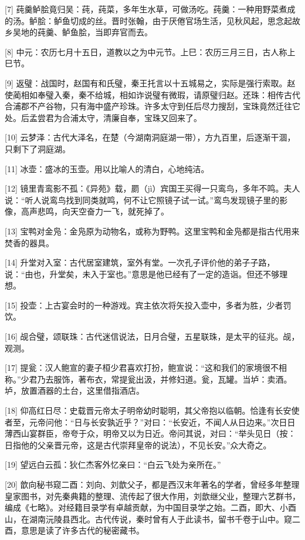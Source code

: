 \documentclass[12pt,UTF8]{ctexbook}
\begin{document}
[7] 莼羹鲈脍竟归吴：莼，莼菜，多年生水草，可做汤吃。莼羹：一种用野菜煮成的汤。鲈脍：鲈鱼切成的丝。晋时张翰，由于厌倦官场生活，见秋风起，思念起故乡吴地的莼羹、鲈鱼脍，当即弃官而去。

[8] 中元：农历七月十五日，道教以之为中元节。上巳：农历三月三日，古人称上巳节。

[9] 返璧：战国时，赵国有和氏璧，秦王托言以十五城易之，实际是强行索取。赵使蔺相如奉璧入秦，秦不给城，相如诈说璧有微瑕，请原璧归赵。还珠：相传古代合浦郡不产谷物，只有海中盛产珍珠。许多太守到任后尽力搜刮，宝珠竟然迁往它处。后孟尝君为合浦太守，清廉自奉，宝珠又回来了。

[10] 云梦泽：古代大泽名，在楚（今湖南洞庭湖一带），方九百里，后逐渐干涸，只剩下了洞庭湖。

[11] 冰壶：盛冰的玉壶。用以比喻人的清白，心地纯洁。

[12] 镜里青鸾影不孤：《异苑》载，罽（jì）宾国王买得一只鸾鸟，多年不鸣。夫人说：“听人说鸾鸟找到同类就鸣，何不让它照镜子试一试。”鸾鸟发现镜子里的影像，高声悲鸣，向天空奋力一飞，就死掉了。

[13] 宝鸭对金凫：金凫原为动物名，或称为野鸭。这里宝鸭和金凫都是指古代用来焚香的器具。

[14] 升堂对入室：古代居室建筑，室外有堂。一次孔子评价他的弟子子路，说：“由也，升堂矣，未入于室也。”意思是他已经有了一定的造诣。但还不够理想。

[15] 投壶：上古宴会时的一种游戏。宾主依次将矢投入壶中，多者为胜，少者罚饮。

[16] 觇合璧，颂联珠：古代迷信说法，日月合璧，五星联珠，是太平的征兆。觇，观测。

[17] 提瓮：汉人鲍宣的妻子桓少君喜欢打扮，鲍宣说：“这和我们的家境很不相称。”少君乃去服饰，著布衣，常提瓮出汲，并修妇道。瓮，瓦罐。当垆：卖酒。垆，放置酒器的土台，这里借指酒店。

[18] 仰高红日尽：史载晋元帝太子明帝幼时聪明，其父帝抱以临朝。恰逢有长安使者至，元帝问他：“日与长安孰近乎？”对曰：“长安近，不闻人从日边来。”次日日薄西山宴群臣，帝夸于众，明帝又以为日近。帝问其说，对曰：“举头见日（按：日指他的父亲晋元帝，这是古代崇拜皇帝的说法），不见长安。”众大奇之。

[19] 望远白云孤：狄仁杰客外忆亲曰：“白云飞处为亲所在。”

[20] 歆向秘书窥二酉：刘向、刘歆父子，都是西汉末年著名的学者，曾经多年整理皇家图书，对先秦典籍的整理、流传起了很大作用，刘歆继父业，整理六艺群书，编成《七略》。对经籍目录学有卓越贡献，为中国目录学之始。二酉，即大、小酉山，在湖南沅陵县西北。古代传说，秦时曾有人于此读书，留书千卷于山中。窥二酉，意思是读了许多古代的秘密藏书。
\end{document}
